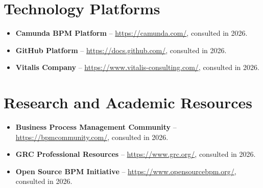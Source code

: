 \section*{Technology Platforms}

\begin{itemize}
\item \textbf{Camunda BPM Platform} -- \url{https://camunda.com/}, consulted in 2026.
\item \textbf{GitHub Platform} -- \url{https://docs.github.com/}, consulted in 2026.
\item \textbf{Vitalis Company} -- \url{https://www.vitalis-consulting.com/}, consulted in 2026.
\end{itemize}

\section*{Research and Academic Resources}

\begin{itemize}
\item \textbf{Business Process Management Community} -- \url{https://bpmcommunity.com/}, consulted in 2026.
\item \textbf{GRC Professional Resources} -- \url{https://www.grc.org/}, consulted in 2026.
\item \textbf{Open Source BPM Initiative} -- \url{https://www.opensourcebpm.org/}, consulted in 2026.
\end{itemize}
